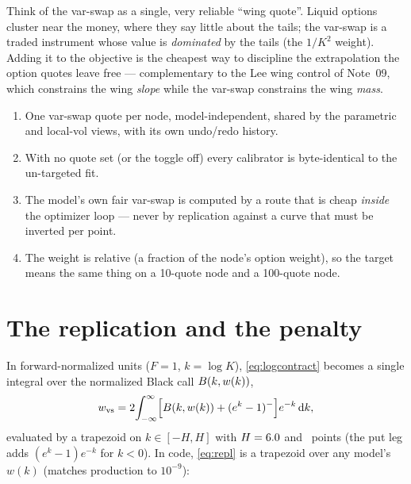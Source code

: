\documentclass[11pt]{article}
\begin{document}
\begin{heuristic}
Think of the var-swap as a single, very reliable ``wing quote''. Liquid options
cluster near the money, where they say little about the tails; the var-swap is a
traded instrument whose value is \emph{dominated} by the tails (the $1/K^2$
weight). Adding it to the objective is the cheapest way to discipline the
extrapolation the option quotes leave free --- complementary to the Lee wing
control of Note~09, which constrains the wing \emph{slope} while the var-swap
constrains the wing \emph{mass}.
\end{heuristic}

\begin{invariant}
\begin{enumerate}[leftmargin=1.6em]
\item One var-swap quote per node, model-independent, shared by the
parametric and local-vol views, with its own undo/redo history.
\item With no quote set (or the toggle off) every calibrator is
byte-identical to the un-targeted fit.
\item The model's own fair var-swap is computed by a route that is cheap
\emph{inside} the optimizer loop --- never by replication against a curve
that must be inverted per point.
\item The weight is relative (a fraction of the node's option weight), so
the target means the same thing on a 10-quote node and a 100-quote node.
\end{enumerate}
\end{invariant}

\section{The replication and the penalty}
\label{sec:penalty}

In forward-normalized units ($F=1$, $k=\log K$), \eqref{eq:logcontract} becomes a
single integral over the normalized Black call $B(k,w(k))$,
\begin{equation}
w_{\text{vs}}=2\!\int_{-\infty}^{\infty}\!\Big[B(k,w(k))+(e^k-1)^-\Big]e^{-k}\,\mathrm{d} k,
\label{eq:repl}
\end{equation}
evaluated by a trapezoid on $k\in[-H,H]$ with $H=6.0$ and \vspoints\
points (the put leg adds $(e^k-1)e^{-k}$ for $k<0$). In code, \eqref{eq:repl} is a
trapezoid over any model's $w(k)$ (matches production to $10^{-9}$):
\end{document}
